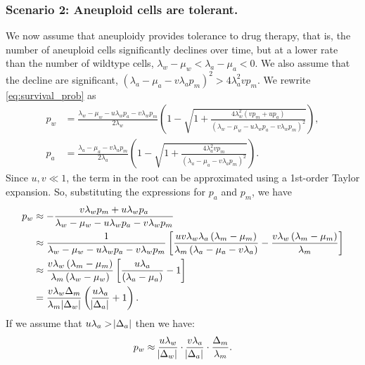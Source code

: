 \documentclass[12pt]{extarticle}
\begin{document}
\begin{appendices}
\subsubsection*{Scenario 2: Aneuploid cells are tolerant.} 

We now assume that aneuploidy provides tolerance to drug therapy, that is, the number of aneuploid cells significantly declines over time, but at a lower rate than the number of wildtype cells, $\lambda_w - \mu_w < \lambda_a - \mu_a < 0$. We also assume that the decline are significant, $\left(\lambda_a-\mu_a-v\lambda_ap_m\right)^2 > 4\lambda_a^2 v p_m$.
We rewrite \cref{eq:survival_prob} as
\begin{equation}
\begin{aligned}
p_w&=\frac{\lambda_w-\mu_w-u\lambda_wp_a-v\lambda_wp_m}{2\lambda_w}\left(1-\sqrt{1+\frac{4\lambda_w^2\left(vp_m+up_a\right)}{\left(\lambda_w-\mu_w-u\lambda_wp_a-v\lambda_wp_m\right)^2}}\right), \\
p_a&=\frac{\lambda_a-\mu_a-v\lambda_ap_m}{2\lambda_a}\left(1-\sqrt{1+\frac{4\lambda_a^2vp_m}{\left(\lambda_a-\mu_a-v\lambda_ap_m\right)^2}}\right) .
\end{aligned}
\end{equation}
Since $u,v\ll1$, the term in the root can be approximated using a 1st-order Taylor expansion. So, substituting the expressions for $p_a$ and $p_m$, we have
\begin{equation} \label{eq:survprobwinitial}
\begin{aligned}
p_w&\approx-\frac{v\lambda_wp_m+u\lambda_wp_a}{\lambda_w-\mu_w-u\lambda_wp_a-v\lambda_wp_m}\\
&\approx\frac{1}{\lambda_w-\mu_w-u\lambda_wp_a-v\lambda_wp_m}\left[\frac{uv\lambda_w\lambda_a\left(\lambda_m-\mu_m\right)}{\lambda_m\left(\lambda_a-\mu_a-v\lambda_a\right)}-\frac{v\lambda_w\left(\lambda_m-\mu_m\right)}{\lambda_m}\right]\\ 
&\approx\frac{v\lambda_w\left(\lambda_m-\mu_m\right)}{\lambda_m\left(\lambda_w-\mu_w\right)}\left[\frac{u\lambda_a}{\left(\lambda_a-\mu_a\right)}-1\right] \\
&=\frac{v\lambda_w\Delta_m}{\lambda_m \abs{\Delta_w}}\left(\frac{u\lambda_a}{\abs{\Delta_a}}+1\right) .
\end{aligned}
\end{equation}
If we assume that $u\lambda_a>\abs{\Delta_a}$ then we have:
\begin{equation}\label{eq:pw_tolerant}
p_w\approx\frac{u\lambda_w}{\abs{\Delta_w}}\cdot\frac{v\lambda_a}{\abs{\Delta_a}}\cdot\frac{\Delta_m}{\lambda_m}.
\end{equation}


\end{appendices}
\end{document}
